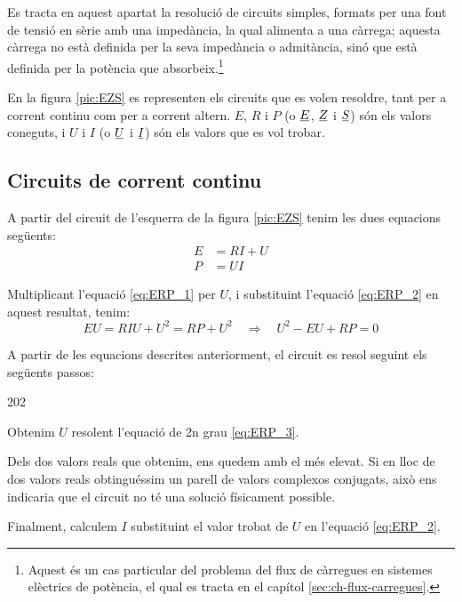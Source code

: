Es tracta en aquest apartat la resolució de circuits simples,
formats per una font de tensió en sèrie amb una impedància, la qual
alimenta a una càrrega; aquesta càrrega no està definida per la seva
impedància o admitància, sinó que està definida per la potència que absorbeix.\footnote{Aquest és un cas particular del problema del flux de càrregues en sistemes elèctrics de potència, el qual es tracta en el capítol \ref{sec:ch-flux-carregues}.}

En la figura \vref{pic:EZS} es representen els circuits que es volen
resoldre, tant per a corrent continu com per a corrent altern. $E$,
$R$ i $P$ (o $\cmplx{E}$, $\cmplx{Z}$ i $\cmplx{S}$) són els valors
coneguts, i $U$ i $I$ (o $\cmplx{U}$ i $\cmplx{I}$) són els valors
que es vol trobar.

\begin{center}
   
     \label{pic:EZS}
\end{center}

\subsection{Circuits de corrent continu}

A partir del circuit de l'esquerra de la figura \vref{pic:EZS} tenim les dues equacions següents:
\begin{align}
   E &= R I + U \label{eq:ERP_1} \\
   P &= U I     \label{eq:ERP_2}
\end{align}

Multiplicant l'equació \eqref{eq:ERP_1} per $U$, i substituint l'equació \eqref{eq:ERP_2} en aquest resultat, tenim:
\begin{equation}
   E U = R I U + U^2 = R P + U^2 \quad \Rightarrow \quad U^2 - E U + R P = 0 \label{eq:ERP_3}
\end{equation}

A partir de les equacions descrites anteriorment, el circuit es resol seguint els següents passos:
\begin{dingautolist}{202}
   \item Obtenim $U$ resolent l'equació de 2n grau \eqref{eq:ERP_3}.
   \item Dels dos valors reals que obtenim, ens quedem amb el més elevat. Si en lloc de dos valors reals obtinguéssim
   un parell de valors  complexos conjugats, això ens indicaria que el circuit no té una solució físicament possible.
   \item Finalment, calculem $I$ substituint el valor trobat de $U$ en l'equació \eqref{eq:ERP_2}.
\end{dingautolist}

